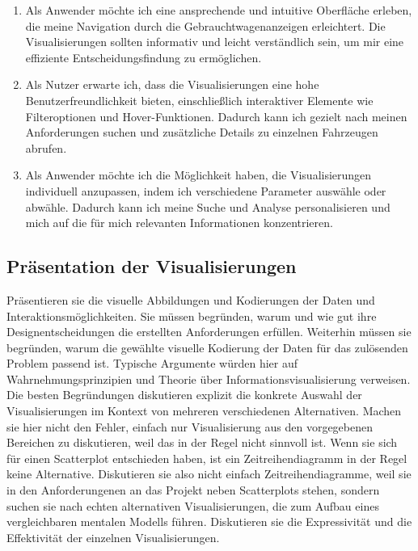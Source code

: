 \documentclass[usegeometry=true]{scrartcl}
\begin{document}
\begin{enumerate}
    \item Als Anwender möchte ich eine ansprechende und intuitive Oberfläche erleben, die meine Navigation durch die Gebrauchtwagenanzeigen erleichtert. Die Visualisierungen sollten informativ und leicht verständlich sein, um mir eine effiziente Entscheidungsfindung zu ermöglichen.
    
    \item Als Nutzer erwarte ich, dass die Visualisierungen eine hohe Benutzerfreundlichkeit bieten, einschließlich interaktiver Elemente wie Filteroptionen und Hover-Funktionen. Dadurch kann ich gezielt nach meinen Anforderungen suchen und zusätzliche Details zu einzelnen Fahrzeugen abrufen.
    
    \item Als Anwender möchte ich die Möglichkeit haben, die Visualisierungen individuell anzupassen, indem ich verschiedene Parameter auswähle oder abwähle. Dadurch kann ich meine Suche und Analyse personalisieren und mich auf die für mich relevanten Informationen konzentrieren.
    
\end{enumerate}

\subsection{Präsentation der Visualisierungen}
Präsentieren sie die visuelle Abbildungen und Kodierungen der Daten und Interaktionsmöglichkeiten. 
Sie müssen  begründen, warum und wie gut ihre Designentscheidungen die erstellten Anforderungen erfüllen. 
Weiterhin müssen sie begründen, warum die gewählte visuelle Kodierung der Daten für das zulösenden Problem passend ist.
Typische Argumente würden hier auf Wahrnehmungsprinzipien und Theorie über Informationsvisualisierung verweisen. 
Die besten Begründungen diskutieren explizit die konkrete Auswahl der Visualisierungen im Kontext von mehreren verschiedenen Alternativen. 
Machen sie hier nicht den Fehler, einfach nur Visualisierung aus den vorgegebenen Bereichen zu diskutieren, weil das in der Regel nicht sinnvoll ist.
Wenn sie sich für einen Scatterplot entschieden haben, ist ein Zeitreihendiagramm in der Regel keine Alternative.
Diskutieren sie also nicht einfach Zeitreihendiagramme, weil sie in den Anforderungenen an das Projekt neben Scatterplots stehen, sondern suchen sie nach echten alternativen Visualisierungen, die zum Aufbau eines vergleichbaren mentalen Modells führen. 
Diskutieren sie die Expressivität und die Effektivität der einzelnen Visualisierungen. 
\end{document}
